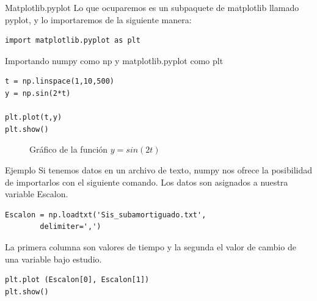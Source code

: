 \documentclass[10pt]{beamer}
\begin{document}
\begin{frame}[fragile]{Matplotlib.pyplot}
	Lo que ocuparemos es un subpaquete de matplotlib llamado \alert{pyplot}, y lo importaremos de la siguiente manera:
	\vspace{1em}
	\begin{verbatim}
import matplotlib.pyplot as plt
	\end{verbatim}
	Importando numpy como np y matplotlib.pyplot como plt
	\begin{verbatim}
t = np.linspace(1,10,500)
y = np.sin(2*t)

plt.plot(t,y)
plt.show()
	\end{verbatim}
\end{frame}

\begin{frame}
	\begin{figure}
		\caption{Gráfico de la función $y = sin(2t)$}
	\end{figure}
\end{frame}

\begin{frame}[fragile]{Ejemplo}
	Si tenemos datos en un archivo de texto, numpy nos ofrece la posibilidad de importarlos con el siguiente comando. Los datos son asignados a nuestra variable \alert{Escalon}.
	\begin{verbatim}
Escalon = np.loadtxt('Sis_subamortiguado.txt', 
		delimiter=',')
	\end{verbatim}

	La primera columna son valores de tiempo y la segunda el valor de cambio de una variable bajo estudio.
	
	\begin{verbatim}
plt.plot (Escalon[0], Escalon[1])
plt.show()
	\end{verbatim}
\end{frame}
\end{document}
